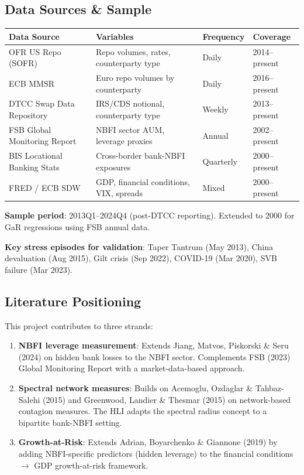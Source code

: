 \documentclass[11pt,a4paper]{article}
\begin{document}
\subsection{Data Sources \& Sample}


{\small
\begin{longtable}{|p{}|p{}|p{}|p{}|}
\hline
\textbf{Data Source} & \textbf{Variables} & \textbf{Frequency} & \textbf{Coverage} \\
\hline
\endhead
OFR US Repo (SOFR) & Repo volumes, rates, counterparty type & Daily & 2014--present \\
\hline
ECB MMSR & Euro repo volumes by counterparty & Daily & 2016--present \\
\hline
DTCC Swap Data Repository & IRS/CDS notional, counterparty type & Weekly & 2013--present \\
\hline
FSB Global Monitoring Report & NBFI sector AUM, leverage proxies & Annual & 2002--present \\
\hline
BIS Locational Banking Stats & Cross-border bank-NBFI exposures & Quarterly & 2000--present \\
\hline
FRED / ECB SDW & GDP, financial conditions, VIX, spreads & Mixed & 2000--present \\
\hline
\end{longtable}
}

\textbf{Sample period}: 2013Q1--2024Q4 (post-DTCC reporting). Extended to 2000 for GaR regressions using FSB annual data.

\textbf{Key stress episodes for validation}: Taper Tantrum (May 2013), China devaluation (Aug 2015), Gilt crisis (Sep 2022), COVID-19 (Mar 2020), SVB failure (Mar 2023).


\subsection{Literature Positioning}

This project contributes to three strands:

\begin{enumerate}
\item \textbf{NBFI leverage measurement}: Extends Jiang, Matvos, Piskorski \& Seru (2024) on hidden bank losses to the NBFI sector. Complements FSB (2023) Global Monitoring Report with a market-data-based approach.

\item \textbf{Spectral network measures}: Builds on Acemoglu, Ozdaglar \& Tahbaz-Salehi (2015) and Greenwood, Landier \& Thesmar (2015) on network-based contagion measures. The HLI adapts the spectral radius concept to a bipartite bank-NBFI setting.

\item \textbf{Growth-at-Risk}: Extends Adrian, Boyarchenko \& Giannone (2019) by adding NBFI-specific predictors (hidden leverage) to the financial conditions $\rightarrow$ GDP growth-at-risk framework.

\end{enumerate}
\end{document}
